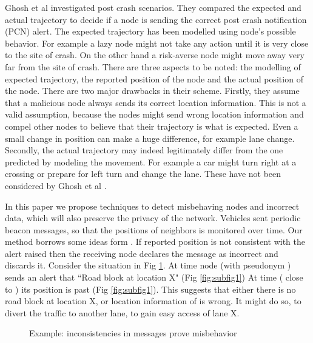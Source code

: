 \documentclass[conference]{IEEEtran}[10pt]
\begin{document}
Ghosh et al \cite{GVGKM10} investigated post crash scenarios. 
They compared the expected and actual trajectory to decide if a node is sending the correct post crash notification (PCN) alert. 
The expected trajectory has been modelled using node's possible behavior. 
For example a lazy node might not take any action until it is very close to the site of crash.
On the other hand a risk-averse node might move away very far from the site of crash.  
There are three aspects to be noted: the modelling of expected trajectory, the reported position of the node and the actual position of the node. 
There are two major drawbacks in their scheme.  
Firstly, they assume that a malicious node always sends its correct location information. 
This is not a valid assumption, because the nodes might send wrong location information and compel other nodes to believe
that their trajectory is what is expected. 
Even a small change in position can make a huge difference, for example lane change. 
Secondly, the actual trajectory may indeed legitimately differ from the one predicted by modeling the movement. For example a car might turn right at a crossing or prepare for left turn
and change the lane. These have not been considered by Ghosh et al \cite{GVGKM10}. 

In this paper we propose techniques to detect misbehaving nodes and incorrect data, which will also preserve the privacy of the network. Vehicles sent periodic beacon messages, so that the positions of neighbors is monitored over time. Our method borrows some ideas form \cite{GVGKM10}.
If reported position is not consistent with the alert raised then the receiving node declares the message as incorrect and discards it. 
Consider the situation in Fig \ref{fig:congestion}. 
At time  node  (with pseudonym ) sends an alert that ``Road block at location X" (Fig \ref{fig:subfig1}) 
At time  ( close to )  its position is past  (Fig \ref{fig:subfig1}).  
This suggests that either there is no road block  at location  X, or location information of  is wrong. 
It might do so, to divert the traffic to another lane, to gain easy access of lane X. 
\begin{figure}[htb]
        \centering
        \label{fig:congestion}
        \caption{Example: inconsistencies in messages prove misbehavior} 

    \end{figure}
\end{document}
